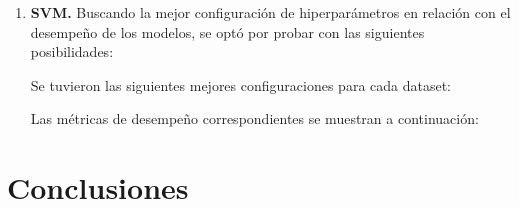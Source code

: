 \documentclass[12pt,a4paper]{article}
\begin{document}
\begin{enumerate}
  \item \textbf{SVM.}
  Buscando la mejor configuración de hiperparámetros en relación con el desempeño de los modelos, se optó por probar 
  con las siguientes posibilidades:

  

  Se tuvieron las siguientes mejores configuraciones para cada dataset:
  
  Las métricas de desempeño correspondientes se muestran a continuación:


\end{enumerate}

\section{Conclusiones}
\end{document}

